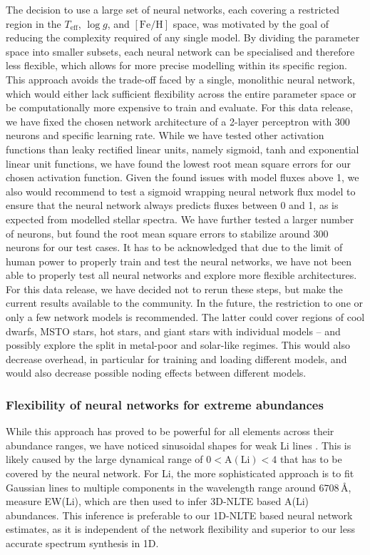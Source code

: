 \documentclass[
  journal=pasa,
  manuscript=research-paper, %
  year=2024,
  volume=37
]{cup-journal}
\newcommand{\Teff}{$T_\mathrm{eff}$\xspace}
\newcommand{\logg}{$\log g$\xspace}
\newcommand{\feh}{$\mathrm{[Fe/H]}$\xspace}
\newcommand{\TLF}{\Teff, \logg, and \feh}
\begin{document}
The decision to use a large set of neural networks, each covering a restricted region in the \TLF space, was motivated by the goal of reducing the complexity required of any single model. By dividing the parameter space into smaller subsets, each neural network can be specialised and therefore less flexible, which allows for more precise modelling within its specific region. This approach avoids the trade-off faced by a single, monolithic neural network, which would either lack sufficient flexibility across the entire parameter space or be computationally more expensive to train and evaluate. For this data release, we have fixed the chosen network architecture of a 2-layer perceptron with 300 neurons and specific learning rate. While we have tested other activation functions than leaky rectified linear units, namely sigmoid, tanh and exponential linear unit functions, we have found the lowest root mean square errors for our chosen activation function. Given the found issues with model fluxes above 1, we also would recommend to test a sigmoid wrapping neural network flux model to ensure that the neural network always predicts fluxes between 0 and 1, as is expected from modelled stellar spectra. We have further tested a larger number of neurons, but found the root mean square errors to stabilize around 300 neurons for our test cases. It has to be acknowledged that due to the limit of human power to properly train and test the neural networks, we have not been able to properly test all neural networks and explore more flexible architectures. For this data release, we have decided not to rerun these steps, but make the current results available to the community. In the future, the restriction to one or only a few network models is recommended. The latter could cover regions of cool dwarfs, MSTO stars, hot stars, and giant stars with individual models -- and possibly explore the split in metal-poor and solar-like regimes. This would also decrease overhead, in particular for training and loading different models, and would also decrease possible noding effects between different models.

\subsubsection{Flexibility of neural networks for extreme abundances}

While this approach has proved to be powerful for all elements across their abundance ranges, we have noticed sinusoidal shapes for weak Li lines \citep[see also][]{Wang2021}. This is likely caused by the large dynamical range of $0 < \mathrm{A(Li)} < 4$ that has to be covered by the neural network. For Li, the more sophisticated approach is to fit Gaussian lines to multiple components in the wavelength range around $6708\,\text{\AA}$, measure EW(Li), which are then used to infer 3D-NLTE based A(Li) abundances. This inference is preferable to our 1D-NLTE based neural network estimates, as it is independent of the network flexibility and superior to our less accurate spectrum synthesis in 1D.
\end{document}
